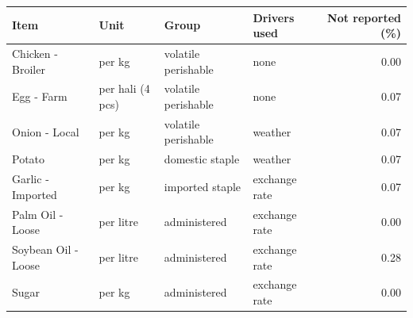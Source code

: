 \begin{tabular}{llllr}
\toprule
\textbf{Item} & \textbf{Unit} & \textbf{Group} & \textbf{Drivers used} & \textbf{Not reported (\%)} \\
\midrule
Chicken - Broiler & per kg & volatile perishable & none & 0.00 \\
Egg - Farm & per hali (4 pcs) & volatile perishable & none & 0.07 \\
Onion - Local & per kg & volatile perishable & weather & 0.07 \\
Potato & per kg & domestic staple & weather & 0.07 \\
Garlic - Imported & per kg & imported staple & exchange rate & 0.07 \\
Palm Oil - Loose & per litre & administered & exchange rate & 0.00 \\
Soybean Oil - Loose & per litre & administered & exchange rate & 0.28 \\
Sugar & per kg & administered & exchange rate & 0.00 \\
\bottomrule
\end{tabular}
